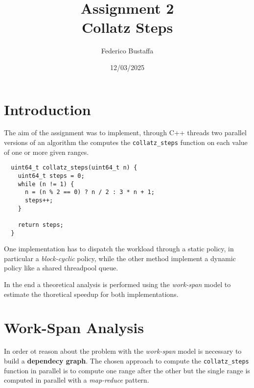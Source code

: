 \documentclass[12pt, a4paper]{article}
\title{Assignment 2\\Collatz Steps}
\author{Federico Bustaffa}
\date{12/03/2025}
\begin{document}
\maketitle
\tableofcontents
\clearpage

\section{Introduction}

The aim of the assignment was to implement, through C++ threads two parallel
versions of an algorithm the computes the \verb|collatz_steps| function on each
value of one or more given ranges.

\begin{verbatim}
  uint64_t collatz_steps(uint64_t n) {
    uint64_t steps = 0;
    while (n != 1) {
      n = (n % 2 == 0) ? n / 2 : 3 * n + 1;
      steps++;
    }

    return steps;
  }
\end{verbatim}

One implementation has to dispatch the workload through a static policy, in
particular a \emph{block-cyclic} policy, while the other method implement a
dynamic policy like a shared threadpool queue.

In the end a theoretical analysis is performed using the \emph{work-span} model
to estimate the thoretical speedup for both implementations.

\section{Work-Span Analysis}

In order ot reason about the problem with the \emph{work-span} model is
necessary to build a \textbf{dependecy graph}. The chosen approach to compute
the \verb|collatz_steps| function in parallel is to compute one range after the
other but the single range is computed in parallel with a \emph{map-reduce}
pattern.

\begin{figure}[H]
  \centering
\end{figure}
\end{document}
